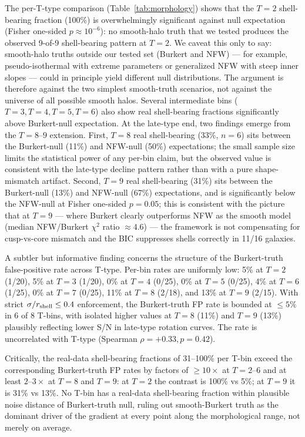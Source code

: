 \documentclass[linenumbers]{aastex701}
\begin{document}
The per-T-type comparison (Table~\ref{tab:morphology}) shows that the $T=2$ shell-bearing fraction (100\%) is overwhelmingly significant against null expectation (Fisher one-sided $p \approx 10^{-6}$): no smooth-halo truth that we tested produces the observed 9-of-9 shell-bearing pattern at $T=2$. We caveat this only to say: smooth-halo truths outside our tested set (Burkert and NFW) --- for example, pseudo-isothermal with extreme parameters or generalized NFW with steep inner slopes --- could in principle yield different null distributions. The argument is therefore against the two simplest smooth-truth scenarios, not against the universe of all possible smooth halos. Several intermediate bins ($T=3, T=4, T=5, T=6$) also show real shell-bearing fractions significantly above Burkert-null expectation. At the late-type end, two findings emerge from the $T=8$--$9$ extension. First, $T=8$ real shell-bearing (33\%, $n=6$) sits between the Burkert-null (11\%) and NFW-null (50\%) expectations; the small sample size limits the statistical power of any per-bin claim, but the observed value is consistent with the late-type decline pattern rather than with a pure shape-mismatch artifact. Second, $T=9$ real shell-bearing (31\%) sits between the Burkert-null (13\%) and NFW-null (67\%) expectations, and is significantly below the NFW-null at Fisher one-sided $p = 0.05$; this is consistent with the picture that at $T=9$ --- where Burkert clearly outperforms NFW as the smooth model (median NFW/Burkert $\chi^2$ ratio $\approx 4.6$) --- the framework is not compensating for cusp-vs-core mismatch and the BIC suppresses shells correctly in 11/16 galaxies.

A subtler but informative finding concerns the structure of the Burkert-truth false-positive rate across T-type. Per-bin rates are uniformly low: 5\% at $T=2$ (1/20), 5\% at $T=3$ (1/20), 0\% at $T=4$ (0/25), 0\% at $T=5$ (0/25), 4\% at $T=6$ (1/25), 0\% at $T=7$ (0/25), 11\% at $T=8$ (2/18), and 13\% at $T=9$ (2/15). With strict $\sigma / r_{\rm shell} \le 0.4$ enforcement, the Burkert-truth FP rate is bounded at $\le 5\%$ in 6 of 8 T-bins, with isolated higher values at $T=8$ (11\%) and $T=9$ (13\%) plausibly reflecting lower S/N in late-type rotation curves. The rate is uncorrelated with T-type (Spearman $\rho = +0.33, p = 0.42$).

Critically, the real-data shell-bearing fractions of 31--100\% per T-bin exceed the corresponding Burkert-truth FP rates by factors of $\ge 10\times$ at $T=2$--$6$ and at least $2$--$3\times$ at $T=8$ and $T=9$: at $T=2$ the contrast is 100\% vs 5\%; at $T=9$ it is 31\% vs 13\%. No T-bin has a real-data shell-bearing fraction within plausible noise distance of Burkert-truth null, ruling out smooth-Burkert truth as the dominant driver of the gradient at every point along the morphological range, not merely on average.
\end{document}
